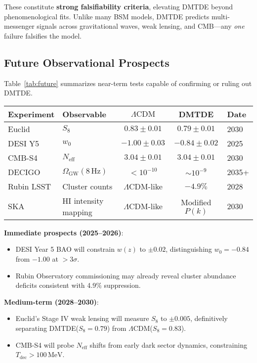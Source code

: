 \documentclass[aps,prd,twocolumn,superscriptaddress,nofootinbib,floatfix,preprintnumbers]{revtex4-2}
\newcommand{\DMTDE}{\textsc{DMTDE}\xspace}
\newcommand{\LCDM}{\ensuremath{\Lambda\text{CDM}}\xspace}
\begin{document}
These constitute \textbf{strong falsifiability criteria}, elevating \DMTDE beyond phenomenological fits. Unlike many BSM models, DMTDE predicts multi-messenger signals across gravitational waves, weak lensing, and CMB—any \textit{one} failure falsifies the model.

\subsection{Future Observational Prospects}
\label{subsec:future}

Table~\ref{tab:future} summarizes near-term tests capable of confirming or ruling out \DMTDE.

\begin{table*}[t]
\caption{Future observational tests of \DMTDE.}
\label{tab:future}
\centering
\small
\centering
\begin{tabular}{llccl}
\toprule
\textbf{Experiment} & \textbf{Observable} & \textbf{\LCDM} & \textbf{\DMTDE} & \textbf{Date} \\
\midrule
Euclid & $S_8$ & $0.83 \pm 0.01$ & $0.79 \pm 0.01$ & 2030 \\
DESI Y5 & $w_0$ & $-1.00 \pm 0.03$ & $-0.84 \pm 0.02$ & 2025 \\
CMB-S4 & $N_\mathrm{eff}$ & $3.04 \pm 0.01$ & $3.04 \pm 0.01$ & 2030 \\
DECIGO & $\Omega_\mathrm{GW}(8\,\mathrm{Hz})$ & $< 10^{-10}$ & $\sim 10^{-9}$ & 2035+ \\
Rubin LSST & Cluster counts & \LCDM-like & $-4.9\%$ & 2028 \\
SKA & HI intensity mapping & \LCDM-like & Modified $P(k)$ & 2030 \\
\bottomrule
\end{tabular}
\end{table*}

\textbf{Immediate prospects (2025--2026)}:
\begin{itemize}
    \item DESI Year 5 BAO will constrain $w(z)$ to $\pm 0.02$, distinguishing $w_0 = -0.84$ from $-1.00$ at $>3\sigma$.
    \item Rubin Observatory commissioning may already reveal cluster abundance deficits consistent with 4.9\% suppression.
\end{itemize}

\textbf{Medium-term (2028--2030)}:
\begin{itemize}
    \item Euclid's Stage IV weak lensing will measure $S_8$ to $\pm 0.005$, definitively separating \DMTDE ($S_8 = 0.79$) from \LCDM ($S_8 = 0.83$).
    \item CMB-S4 will probe $N_\mathrm{eff}$ shifts from early dark sector dynamics, constraining $T_\mathrm{dec} > 100\,\mathrm{MeV}$.
\end{itemize}
\end{document}
